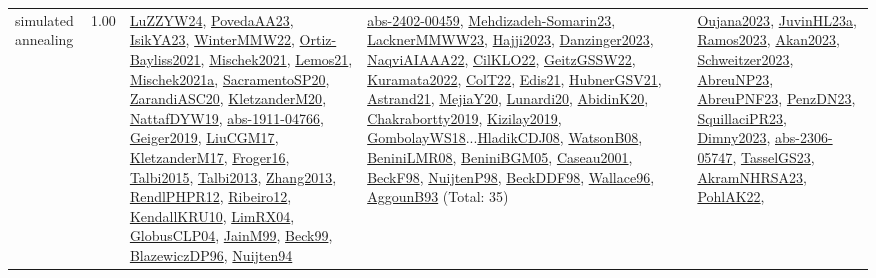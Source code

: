 {\begin{longtable}{p{3cm}r>{\raggedright\arraybackslash}p{6cm}>{\raggedright\arraybackslash}p{6cm}>{\raggedright\arraybackslash}p{8cm}}
\index{simulated annealing}\index{Algorithms!simulated annealing}simulated annealing &  1.00 & \hyperref[detail:LuZZYW24]{LuZZYW24}, \hyperref[detail:PovedaAA23]{PovedaAA23}, \hyperref[detail:IsikYA23]{IsikYA23}, \hyperref[detail:WinterMMW22]{WinterMMW22}, \hyperref[detail:Ortiz-Bayliss2021]{Ortiz-Bayliss2021}, \hyperref[detail:Mischek2021]{Mischek2021}, \hyperref[detail:Lemos21]{Lemos21}, \hyperref[detail:Mischek2021a]{Mischek2021a}, \hyperref[detail:SacramentoSP20]{SacramentoSP20}, \hyperref[detail:ZarandiASC20]{ZarandiASC20}, \hyperref[detail:KletzanderM20]{KletzanderM20}, \hyperref[detail:NattafDYW19]{NattafDYW19}, \hyperref[detail:abs-1911-04766]{abs-1911-04766}, \hyperref[detail:Geiger2019]{Geiger2019}, \hyperref[detail:LiuCGM17]{LiuCGM17}, \hyperref[detail:KletzanderM17]{KletzanderM17}, \hyperref[detail:Froger16]{Froger16}, \hyperref[detail:Talbi2015]{Talbi2015}, \hyperref[detail:Talbi2013]{Talbi2013}, \hyperref[detail:Zhang2013]{Zhang2013}, \hyperref[detail:RendlPHPR12]{RendlPHPR12}, \hyperref[detail:Ribeiro12]{Ribeiro12}, \hyperref[detail:KendallKRU10]{KendallKRU10}, \hyperref[detail:LimRX04]{LimRX04}, \hyperref[detail:GlobusCLP04]{GlobusCLP04}, \hyperref[detail:JainM99]{JainM99}, \hyperref[detail:Beck99]{Beck99}, \hyperref[detail:BlazewiczDP96]{BlazewiczDP96}, \hyperref[detail:Nuijten94]{Nuijten94} & \hyperref[detail:abs-2402-00459]{abs-2402-00459}, \hyperref[detail:Mehdizadeh-Somarin23]{Mehdizadeh-Somarin23}, \hyperref[detail:LacknerMMWW23]{LacknerMMWW23}, \hyperref[detail:Hajji2023]{Hajji2023}, \hyperref[detail:Danzinger2023]{Danzinger2023}, \hyperref[detail:NaqviAIAAA22]{NaqviAIAAA22}, \hyperref[detail:CilKLO22]{CilKLO22}, \hyperref[detail:GeitzGSSW22]{GeitzGSSW22}, \hyperref[detail:Kuramata2022]{Kuramata2022}, \hyperref[detail:ColT22]{ColT22}, \hyperref[detail:Edis21]{Edis21}, \hyperref[detail:HubnerGSV21]{HubnerGSV21}, \hyperref[detail:Astrand21]{Astrand21}, \hyperref[detail:MejiaY20]{MejiaY20}, \hyperref[detail:Lunardi20]{Lunardi20}, \hyperref[detail:AbidinK20]{AbidinK20}, \hyperref[detail:Chakrabortty2019]{Chakrabortty2019}, \hyperref[detail:Kizilay2019]{Kizilay2019}, \hyperref[detail:GombolayWS18]{GombolayWS18}...\hyperref[detail:HladikCDJ08]{HladikCDJ08}, \hyperref[detail:WatsonB08]{WatsonB08}, \hyperref[detail:BeniniLMR08]{BeniniLMR08}, \hyperref[detail:BeniniBGM05]{BeniniBGM05}, \hyperref[detail:Caseau2001]{Caseau2001}, \hyperref[detail:BeckF98]{BeckF98}, \hyperref[detail:NuijtenP98]{NuijtenP98}, \hyperref[detail:BeckDDF98]{BeckDDF98}, \hyperref[detail:Wallace96]{Wallace96}, \hyperref[detail:AggounB93]{AggounB93} (Total: 35) & \hyperref[detail:Oujana2023]{Oujana2023}, \hyperref[detail:JuvinHL23a]{JuvinHL23a}, \hyperref[detail:Ramos2023]{Ramos2023}, \hyperref[detail:Akan2023]{Akan2023}, \hyperref[detail:Schweitzer2023]{Schweitzer2023}, \hyperref[detail:AbreuNP23]{AbreuNP23}, \hyperref[detail:AbreuPNF23]{AbreuPNF23}, \hyperref[detail:PenzDN23]{PenzDN23}, \hyperref[detail:SquillaciPR23]{SquillaciPR23}, \hyperref[detail:Dimny2023]{Dimny2023}, \hyperref[detail:abs-2306-05747]{abs-2306-05747}, \hyperref[detail:TasselGS23]{TasselGS23}, \hyperref[detail:AkramNHRSA23]{AkramNHRSA23}, \hyperref[detail:PohlAK22]{PohlAK22}, 
\end{longtable}}
